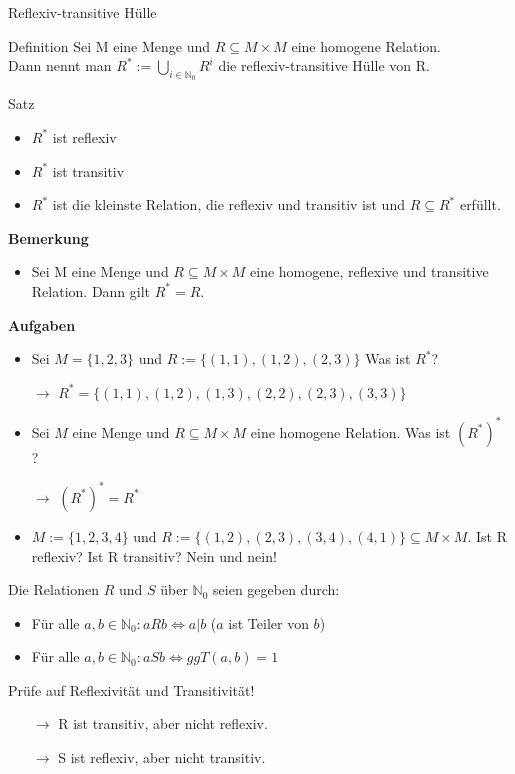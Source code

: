 \documentclass[handout]{beamer}
\begin{document}
\begin{frame}{Reflexiv-transitive Hülle}
	\bp\begin{block}{Definition}
		Sei M eine Menge und $R \subseteq M \times M$ eine homogene Relation. \\Dann nennt man $R^* := \bigcup\limits_{i \in \mathbb{N}_0} R^i$ die reflexiv-transitive Hülle von R.
	\end{block}
	\bp\begin{block}{Satz}
		\begin{itemize}
			\item $R^*$ ist reflexiv
			\item $R^*$ ist transitiv
			\item $R^*$ ist die kleinste Relation, die reflexiv und transitiv ist und $R \subseteq R^*$ erfüllt.
		\end{itemize}
	\end{block}
	\bp\textbf{Bemerkung}\\
	\begin{itemize}
		\item Sei M eine Menge und $R\subseteq M \times M$ eine homogene, reflexive und transitive Relation. Dann gilt $R^* = R$.
	\end{itemize}
	
\end{frame}
\begin{frame}
	\textbf{Aufgaben}\\
	\begin{itemize}
		\item Sei $M = \{1, 2, 3\}$ und $R := \{(1,1), (1,2), (2,3)\}$ Was ist $R^*$?
		\pause
		\item[$\rightarrow$] $R^* = \{(1,1), (1,2), (1,3), (2,2), (2,3), (3,3)\}$ 
		\pause
		\item Sei $M$ eine Menge und $R \subseteq M \times M$ eine homogene Relation. Was ist $(R^*)^*$ ?
		\pause
		\item[$\rightarrow$]  $(R^*)^* = R^*$
		\pause
		\item $M := \{1,2,3,4\} \text{ und } R := \{(1,2), (2,3), (3,4), (4,1)\} \subseteq M \times M$. Ist R reflexiv? Ist R transitiv? \pause \hspace{0.3cm} Nein und nein!
	\end{itemize}
\end{frame}

\begin{frame}
	Die Relationen $R$ und $S$ über $\mathbb{N}_0$ seien gegeben durch:
	\begin{itemize}
		\item Für alle $a, b \in \mathbb{N}_0: aRb \Leftrightarrow a|b$ ($a$ ist Teiler von $b$)
		\item Für alle $a, b \in \mathbb{N}_0: aSb \Leftrightarrow ggT(a,b) = 1$ 
	\end{itemize}
	Prüfe auf Reflexivität und Transitivität!
	\pause
	\begin{itemize}
		\item[$\rightarrow$] R ist transitiv, aber nicht reflexiv.
		\pause
		\item[$\rightarrow$] S ist reflexiv, aber nicht transitiv.
	\end{itemize}
\end{frame}


\end{document}
